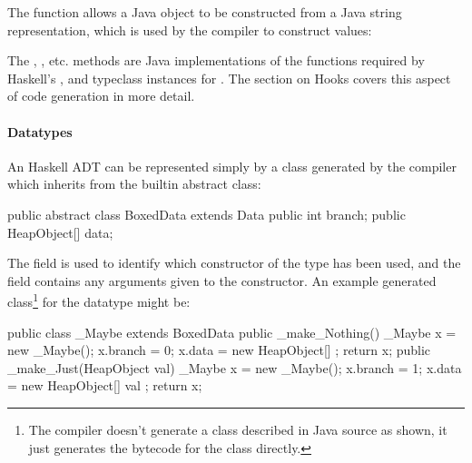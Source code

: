 \documentclass[dissertation.tex]{subfiles}
\begin{document}
{{{{                The  function allows a Java  object to be constructed from a
                Java string representation, which is used by the compiler to construct  values:


                The , , etc. methods are Java implementations of the functions required by Haskell's
                ,  and  typeclass instances for . The section on
                Hooks covers this aspect of code generation in more detail.

            }
            \paragraph*{Datatypes}
            {
                
                An Haskell ADT can be represented simply by a class generated by the compiler which inherits from the
                 builtin abstract class:

                \begin{javafigure}
                public abstract class BoxedData extends Data {
                    public int branch;
                    public HeapObject[] data;
                }
                \end{javafigure}

                The  field is used to identify which constructor of the type has been used, and the
                 field contains any arguments given to the constructor. An example generated
                class\footnote{The compiler doesn't generate a class described in Java source as shown, it just
                generates the bytecode for the class directly.} for the datatype  might be:

                \begin{javafigure}
                public class _Maybe extends BoxedData {
                    public _make_Nothing() {
                        _Maybe x = new _Maybe();
                        x.branch = 0;
                        x.data = new HeapObject[] {};
                        return x;
                    }
                    public _make_Just(HeapObject val) {
                        _Maybe x = new _Maybe();
                        x.branch = 1;
                        x.data = new HeapObject[] { val };
                        return x;
                    }
                }
                \end{javafigure}

}}}}
\end{document}
